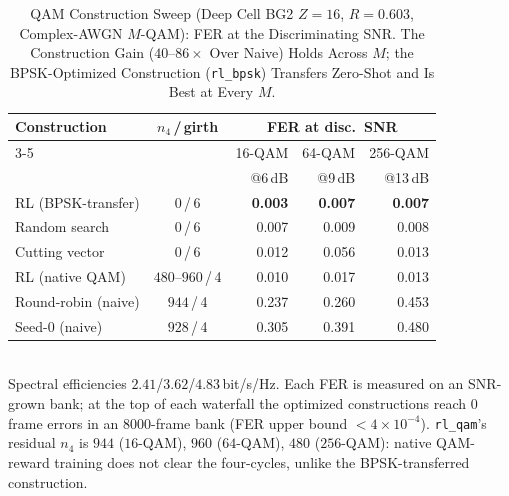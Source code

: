 \documentclass[journal]{IEEEtran}
\begin{document}
\begin{table}[t]
\centering
\caption{QAM Construction Sweep (Deep Cell BG2 $Z{=}16$, $R{=}0.603$,
Complex-AWGN $M$-QAM): FER at the Discriminating SNR. The Construction Gain
($40$--$86\times$ Over Naive) Holds Across $M$; the BPSK-Optimized Construction
(\texttt{rl\_bpsk}) Transfers Zero-Shot and Is Best at Every $M$.}
\label{tab:qam}
\renewcommand{\arraystretch}{1.2}
\setlength{\tabcolsep}{4pt}
\footnotesize
\begin{tabular}{@{}lcrrr@{}}
\toprule
Construction & $n_4$\,/\,girth & \multicolumn{3}{c}{FER at disc.\ SNR}\\
\cmidrule(l){3-5}
 & & 16-QAM & 64-QAM & 256-QAM\\
 & & @6\,dB & @9\,dB & @13\,dB\\
\midrule
RL (BPSK-transfer)  & $0$\,/\,6 & \textbf{0.003} & \textbf{0.007} & \textbf{0.007}\\
Random search       & $0$\,/\,6 & 0.007 & 0.009 & 0.008\\
Cutting vector~\cite{mitchell2015scldpc} & $0$\,/\,6 & 0.012 & 0.056 & 0.013\\
RL (native QAM)     & $480$--$960$\,/\,4 & 0.010 & 0.017 & 0.013\\
\midrule
Round-robin (naive) & $944$\,/\,4 & 0.237 & 0.260 & 0.453\\
Seed-0 (naive)      & $928$\,/\,4 & 0.305 & 0.391 & 0.480\\
\bottomrule
\end{tabular}
\\[3pt]
{\footnotesize Spectral efficiencies $2.41$/$3.62$/$4.83$\,bit/s/Hz. Each FER is
measured on an SNR-grown bank; at the top of each waterfall the optimized
constructions reach $0$ frame errors in an $8000$-frame bank (FER upper bound
$<4\times10^{-4}$). \texttt{rl\_qam}'s residual $n_4$ is $944$ ($16$-QAM),
$960$ ($64$-QAM), $480$ ($256$-QAM): native QAM-reward training does not clear the
four-cycles, unlike the BPSK-transferred construction.}
\end{table}
\end{document}
